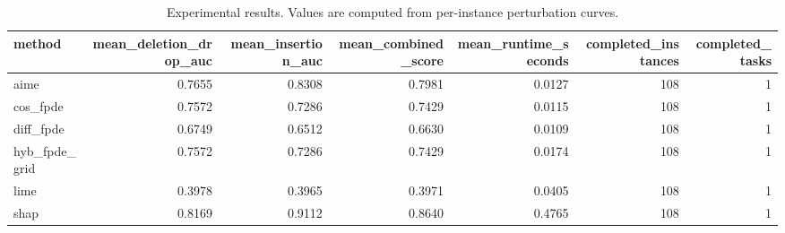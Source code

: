 \begin{table}[t]
\caption{Experimental results. Values are computed from per-instance perturbation curves.}
\label{tab:main_results_computed}
\centering
\begin{tabular}{lrrrrrr}
\toprule
method & mean\_deletion\_drop\_auc & mean\_insertion\_auc & mean\_combined\_score & mean\_runtime\_seconds & completed\_instances & completed\_tasks \\
\midrule
aime & 0.7655 & 0.8308 & 0.7981 & 0.0127 & 108 & 1 \\
cos\_fpde & 0.7572 & 0.7286 & 0.7429 & 0.0115 & 108 & 1 \\
diff\_fpde & 0.6749 & 0.6512 & 0.6630 & 0.0109 & 108 & 1 \\
hyb\_fpde\_grid & 0.7572 & 0.7286 & 0.7429 & 0.0174 & 108 & 1 \\
lime & 0.3978 & 0.3965 & 0.3971 & 0.0405 & 108 & 1 \\
shap & 0.8169 & 0.9112 & 0.8640 & 0.4765 & 108 & 1 \\
\bottomrule
\end{tabular}

\end{table}
